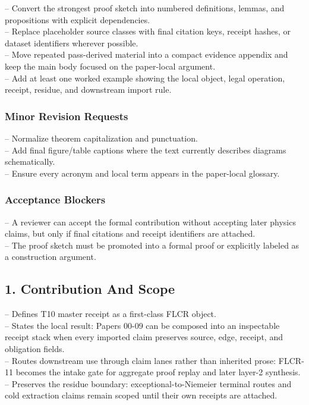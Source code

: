\documentclass[11pt]{article}
\begin{document}
\noindent{}-- Convert the strongest proof sketch into numbered definitions, lemmas, and propositions with explicit dependencies.\\
\noindent{}-- Replace placeholder source classes with final citation keys, receipt hashes, or dataset identifiers wherever possible.\\
\noindent{}-- Move repeated pass-derived material into a compact evidence appendix and keep the main body focused on the paper-local argument.\\
\noindent{}-- Add at least one worked example showing the local object, legal operation, receipt, residue, and downstream import rule.\\

\subsubsection*{Minor Revision Requests}

\noindent{}-- Normalize theorem capitalization and punctuation.\\
\noindent{}-- Add final figure/table captions where the text currently describes diagrams schematically.\\
\noindent{}-- Ensure every acronym and local term appears in the paper-local glossary.\\

\subsubsection*{Acceptance Blockers}

\noindent{}-- A reviewer can accept the formal contribution without accepting later physics claims, but only if final citations and receipt identifiers are attached.\\
\noindent{}-- The proof sketch must be promoted into a formal proof or explicitly labeled as a construction argument.\\


\subsection*{1. Contribution And Scope}

\noindent{}-- Defines T10 master receipt as a first-class FLCR object.\\
\noindent{}-- States the local result: Papers 00-09 can be composed into an inspectable receipt stack when every imported claim preserves source, edge, receipt, and obligation fields.\\
\noindent{}-- Routes downstream use through claim lanes rather than inherited prose: FLCR-11 becomes the intake gate for aggregate proof replay and later layer-2 synthesis.\\
\noindent{}-- Preserves the residue boundary: exceptional-to-Niemeier terminal routes and cold extraction claims remain scoped until their own receipts are attached.\\
\end{document}
